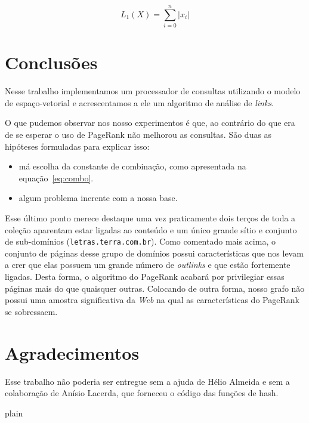 \documentclass[10pt,twocolumn]{article}
\begin{document}
\begin{equation}
L_1(X) = \sum_{i=0}^{n}|x_i|
\label{eq:l1}
\end{equation}




\section{Conclusões}


Nesse trabalho implementamos um processador de consultas utilizando o
modelo de espaço-vetorial e acrescentamos a ele um algoritmo de análise
de \emph{links}.

O que pudemos observar nos nosso experimentos é que, ao contrário do que
era de se esperar o uso de PageRank não melhorou as consultas. São duas
as hipóteses formuladas para explicar isso:
\begin{itemize}
\item má escolha da constante de combinação, como apresentada na
equação~\ref{eq:combo}.
\item algum problema inerente com a nossa base.
\end{itemize}

Esse último ponto merece destaque uma vez praticamente dois terços de
toda a coleção aparentam estar ligadas ao conteúdo e um único grande
sítio e conjunto de sub-domínios (\texttt{letras.terra.com.br}). Como
comentado mais acima, o conjunto de páginas desse grupo de domínios
possui características que nos levam a crer que elas possuem um grande
número de \emph{outlinks} e que estão fortemente ligadas. Desta forma, o
algoritmo do PageRank acabará por privilegiar essas páginas mais do que
quaisquer outras. Colocando de outra forma, nosso grafo não possui uma
amostra significativa da \emph{Web} na qual as características do
PageRank se sobressaem.


\section{Agradecimentos}

Esse trabalho não poderia ser entregue sem a ajuda de Hélio Almeida e
sem a colaboração de  Anísio Lacerda, que forneceu o código das funções
de hash.



 {plain}

\end{document}
